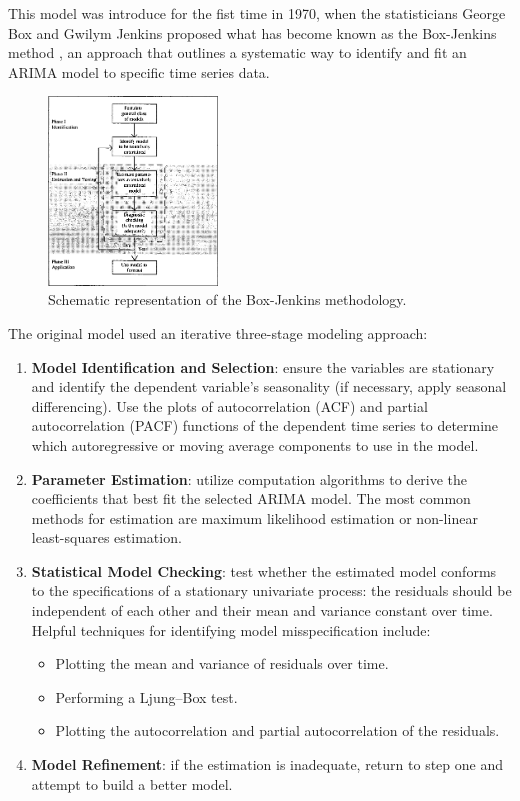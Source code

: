 This model was introduce for the fist time in 1970, when the statisticians George Box and Gwilym Jenkins proposed what has become known as the Box-Jenkins method \cite{box1970time}, an approach that outlines a systematic way to identify and fit an ARIMA model to specific time series data.
\begin{figure}[H] 
    \centering
    \includegraphics[width=0.4\textwidth]{Machine_learning_thesis/Images/Box_Jenkins_methodology.png}
    \caption{Schematic representation of the Box-Jenkins methodology.} 
    \label{fig:box_jenkins_methodology} 
\end{figure}

The original model used an iterative three-stage modeling approach:
\begin{enumerate}
    \item \textbf{Model Identification and Selection}: ensure the variables are stationary and identify the dependent variable's seasonality (if necessary, apply seasonal differencing). Use the plots of autocorrelation (ACF) and partial autocorrelation (PACF) functions of the dependent time series to determine which autoregressive or moving average components to use in the model.
    \item \textbf{Parameter Estimation}: utilize computation algorithms to derive the coefficients that best fit the selected ARIMA model. The most common methods for estimation are maximum likelihood estimation or non-linear least-squares estimation.
    \item \textbf{Statistical Model Checking}: test whether the estimated model conforms to the specifications of a stationary univariate process:  the residuals should be independent of each other and their mean and variance constant over time. Helpful techniques for identifying model misspecification include:
    \begin{itemize}
            \item Plotting the mean and variance of residuals over time.
            \item Performing a Ljung–Box test.
            \item Plotting the autocorrelation and partial autocorrelation of the residuals.
    \end{itemize}
    \item \textbf{Model Refinement}: if the estimation is inadequate, return to step one and attempt to build a better model.
\end{enumerate}

